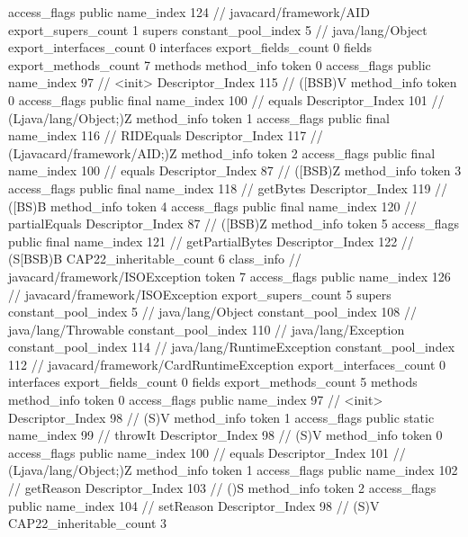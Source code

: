 {{{			access_flags	public
			name_index	124		// javacard/framework/AID
			export_supers_count	1
			supers {
				constant_pool_index	5		// java/lang/Object
			}
			export_interfaces_count	0
			interfaces {
			}
			export_fields_count	0
			fields {
			}
			export_methods_count	7
			methods {
				method_info {
					token	0
					access_flags	public
					name_index	97		// <init>
					Descriptor_Index	115		// ([BSB)V
				}
				method_info {
					token	0
					access_flags	public final
					name_index	100		// equals
					Descriptor_Index	101		// (Ljava/lang/Object;)Z
				}
				method_info {
					token	1
					access_flags	public final
					name_index	116		// RIDEquals
					Descriptor_Index	117		// (Ljavacard/framework/AID;)Z
				}
				method_info {
					token	2
					access_flags	public final
					name_index	100		// equals
					Descriptor_Index	87		// ([BSB)Z
				}
				method_info {
					token	3
					access_flags	public final
					name_index	118		// getBytes
					Descriptor_Index	119		// ([BS)B
				}
				method_info {
					token	4
					access_flags	public final
					name_index	120		// partialEquals
					Descriptor_Index	87		// ([BSB)Z
				}
				method_info {
					token	5
					access_flags	public final
					name_index	121		// getPartialBytes
					Descriptor_Index	122		// (S[BSB)B
				}
			}
			CAP22_inheritable_count	6
		}
		class_info {		// javacard/framework/ISOException
			token	7
			access_flags	public
			name_index	126		// javacard/framework/ISOException
			export_supers_count	5
			supers {
				constant_pool_index	5		// java/lang/Object
				constant_pool_index	108		// java/lang/Throwable
				constant_pool_index	110		// java/lang/Exception
				constant_pool_index	114		// java/lang/RuntimeException
				constant_pool_index	112		// javacard/framework/CardRuntimeException
			}
			export_interfaces_count	0
			interfaces {
			}
			export_fields_count	0
			fields {
			}
			export_methods_count	5
			methods {
				method_info {
					token	0
					access_flags	public
					name_index	97		// <init>
					Descriptor_Index	98		// (S)V
				}
				method_info {
					token	1
					access_flags	public static
					name_index	99		// throwIt
					Descriptor_Index	98		// (S)V
				}
				method_info {
					token	0
					access_flags	public
					name_index	100		// equals
					Descriptor_Index	101		// (Ljava/lang/Object;)Z
				}
				method_info {
					token	1
					access_flags	public
					name_index	102		// getReason
					Descriptor_Index	103		// ()S
				}
				method_info {
					token	2
					access_flags	public
					name_index	104		// setReason
					Descriptor_Index	98		// (S)V
				}
			}
			CAP22_inheritable_count	3
}}}
